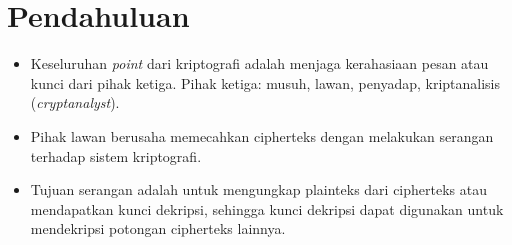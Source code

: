\documentclass{article}
\begin{document}

\section*{Pendahuluan}

\begin{itemize}
    \item Keseluruhan \textit{point} dari kriptografi adalah menjaga kerahasiaan pesan atau kunci dari pihak ketiga. Pihak ketiga: musuh, lawan, penyadap, kriptanalisis (\textit{cryptanalyst}).
    \item Pihak lawan berusaha memecahkan cipherteks dengan melakukan serangan terhadap sistem kriptografi.
    \item Tujuan serangan adalah untuk mengungkap plainteks dari cipherteks atau mendapatkan kunci dekripsi, sehingga kunci dekripsi dapat digunakan untuk mendekripsi potongan cipherteks lainnya.
\end{itemize}
\end{document}
